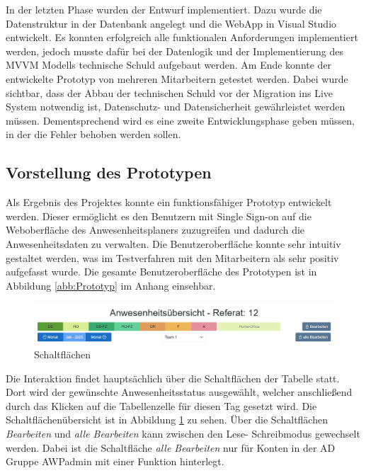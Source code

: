 In der letzten Phase wurden der Entwurf implementiert. Dazu wurde die Datenstruktur in der Datenbank angelegt und die WebApp in Visual Studio entwickelt. Es konnten erfolgreich alle funktionalen Anforderungen implementiert werden, jedoch musste dafür bei der Datenlogik und der Implementierung des MVVM Modells technische Schuld aufgebaut werden. Am Ende konnte der entwickelte Prototyp von mehreren Mitarbeitern getestet werden. Dabei wurde sichtbar, dass der Abbau der technischen Schuld vor der Migration ins Live System notwendig ist, Datenschutz- und Datensicherheit gewährleistet werden müssen. Dementsprechend wird es eine zweite Entwicklungsphase geben müssen, in der die Fehler behoben werden sollen.

\subsection{Vorstellung des Prototypen}
\label{sec:Prototyp}
Als Ergebnis des Projektes konnte ein funktionsfähiger Prototyp entwickelt werden. Dieser ermöglicht es den Benutzern mit Single Sign-on auf die Weboberfläche des Anwesenheitsplaners zuzugreifen und dadurch die Anwesenheitsdaten zu verwalten. Die Benutzeroberfläche konnte sehr intuitiv gestaltet werden, was im Testverfahren mit den Mitarbeitern als sehr positiv aufgefasst wurde. Die gesamte Benutzeroberfläche des Prototypen ist in Abbildung \ref{abb:Prototyp} im Anhang einsehbar.

\begin{figure}[htb]
    \centering
    \includegraphics[width=1\textwidth,angle=0]{abb/Buttons_GUI.png}
    \caption[Beschreibung]{Schaltflächen}
    \label{abb:Buttons_GUI}
\end{figure}

Die Interaktion findet hauptsächlich über die Schaltflächen der Tabelle statt. Dort wird der gewünschte Anwesenheitsstatus ausgewählt, welcher anschließend durch das Klicken auf die Tabellenzelle für diesen Tag gesetzt wird. Die Schaltflächenübersicht ist in Abbildung \ref{abb:Buttons_GUI} zu sehen. Über die Schaltflächen \textit{Bearbeiten} und \textit{alle Bearbeiten} kann zwischen den Lese- \bzw Schreibmodus gewechselt werden. Dabei ist die Schaltfläche \textit{alle Bearbeiten} nur für Konten in der AD Gruppe AWPadmin mit einer Funktion hinterlegt.


